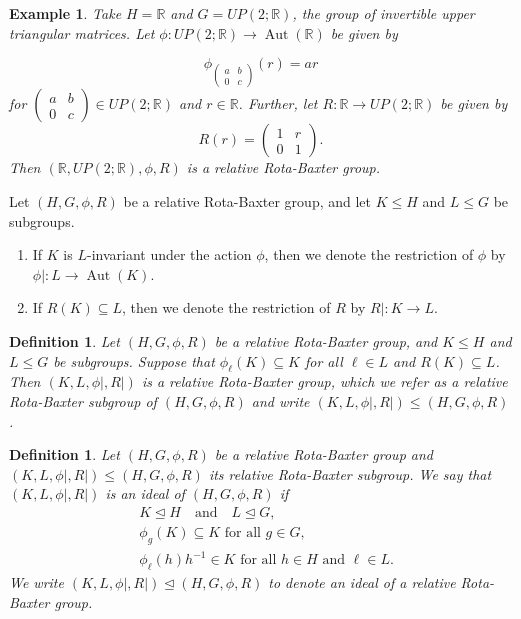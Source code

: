 \documentclass[11pt]{amsart}
\theoremstyle{thrm}
\theoremstyle{plain}
\newtheorem{defn}[thm]{Definition}
\newtheorem{example}[thm]{Example}
\theoremstyle{definition}
\newcommand{\Aut}{\operatorname{Aut} }
\numberwithin{equation}{section}
\begin{document}
\begin{example}
Take $H= \mathbb{R}$ and $G=UP(2; \mathbb{R})$, the group of invertible upper triangular matrices. Let $\phi:UP(2; \mathbb{R})\to \Aut(\mathbb{R})$ be given by

$$\phi_{\begin{pmatrix} a & b \\ 0 & c \end{pmatrix}}(r)= ar$$
for $\begin{pmatrix} a & b \\ 0 & c \end{pmatrix} \in UP(2; \mathbb{R})$ and $r \in \mathbb{R}$. Further, let $R: \mathbb{R} \to  UP(2; \mathbb{R})$ be given by $$R(r)=\begin{pmatrix} 1 & r \\ 0 & 1 \end{pmatrix}.$$ Then $(\mathbb{R},UP(2; \mathbb{R}), \phi, R)$ is a relative Rota-Baxter group.
\end{example}

	Let  $(H, G, \phi, R)$ be a relative Rota-Baxter group, and let $K \leq H$ and $L \leq G$ be subgroups.
\begin{enumerate}
	\item If $K$ is $L$-invariant under the action $\phi$, then we denote the restriction of $\phi$ by $\phi|: L \to \Aut(K)$. 
	\item If $R(K) \subseteq L$, then we denote the restriction of $R$ by $R|: K \to L$.
\end{enumerate}

\begin{defn}
	Let $(H,G,\phi,R)$ be a relative Rota-Baxter group, and $K\leq H$ and $L\leq G$ be subgroups. Suppose that  $\phi_\ell(K) \subseteq K$ for all $\ell \in L$ and $R(K) \subseteq L$. Then $(K,L,\phi |,R |)$ is a relative Rota-Baxter group, which we refer as a relative Rota-Baxter subgroup of $(H,G,\phi,R)$ and write $(K,L,\phi |,R |)\leq(H,G,\phi,R)$.
\end{defn}

\begin{defn}\label{defn ideal rbb-datum}
	Let $(H, G, \phi, R)$ be a relative Rota-Baxter group and  $(K, L,  \phi|, R|) \leq (H, G, \phi, R)$ its relative Rota-Baxter subgroup. We say that $(K, L,  \phi|, R|)$ is an ideal of $(H, G, \phi, R)$ if 
	\begin{align}
		& K \trianglelefteq H \quad \mbox{and} \quad L \trianglelefteq G, \label{I0}\\
		& \phi_g(K) \subseteq K  \mbox{ for all } g \in G, \label{I1} \\
		& \phi_\ell(h) h^{-1} \in K \mbox{ for all } h \in H \mbox{ and }  \ell \in L. \label{I2}
	\end{align}
	We write $(K, L, \phi|, R|) \trianglelefteq (H, G, \phi, R)$ to denote an ideal of a relative Rota-Baxter group. 
\end{defn}
\end{document}

